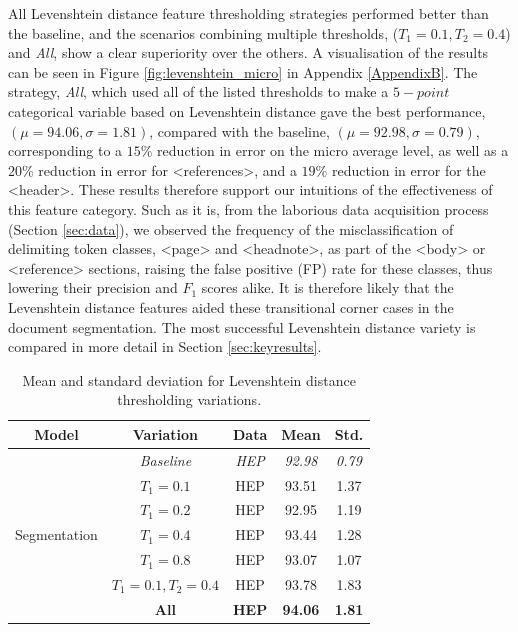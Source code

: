 All Levenshtein distance feature thresholding strategies performed better than the baseline, and the scenarios combining multiple thresholds, ($T_1 = 0.1, T_2 = 0.4$) and \emph{All}, show a clear superiority over the others. A visualisation of the results can be seen in Figure \ref{fig:levenshtein_micro} in Appendix \ref{AppendixB}. The strategy, \emph{All}, which used all of the listed thresholds to make a $5-point$ categorical variable based on Levenshtein distance gave the best performance, $(\mu = 94.06, \sigma = 1.81)$, compared with the baseline, $(\mu = 92.98, \sigma = 0.79)$, corresponding to a $15\%$ reduction in error on the micro average level, as well as a $20\%$ reduction in error for <references>, and a $19\%$ reduction in error for the <header>. These results therefore support our intuitions of the effectiveness of this feature category. Such as it is, from the laborious data acquisition process (Section \ref{sec:data}), we observed the frequency of the misclassification of delimiting token classes, <page> and <headnote>, as part of the <body> or <reference> sections, raising the false positive (FP) rate for these classes, thus lowering their precision and $F_1$ scores alike. It is therefore likely that the Levenshtein distance features aided these transitional corner cases in the document segmentation. The most successful Levenshtein distance variety is compared in more detail in Section \ref{sec:keyresults}. 

\begin{table}[h]
\begin{center}
\begin{tabular}{|c|c|c|c|c|}
\hline
Model & Variation & Data & Mean & Std.\\
\hline
\multirow{7}{*}{Segmentation} & \emph{Baseline} & \emph{HEP} & \emph{92.98} & \emph{0.79} \\\cline{2-5}
& $T_1 = 0.1$ & HEP & 93.51 & 1.37\\\cline{2-5}
& $T_1 = 0.2$ & HEP & 92.95 & 1.19\\\cline{2-5}
& $T_1 = 0.4$ & HEP & 93.44 & 1.28\\\cline{2-5}
& $T_1 = 0.8$ & HEP & 93.07 & 1.07\\\cline{2-5}
& $T_1 = 0.1, T_2 = 0.4$ & HEP & 93.78 & 1.83\\\cline{2-5}
& \textbf{All} & \textbf{HEP} & \textbf{94.06} & \textbf{1.81}\\\cline{2-5}
\hline
\end{tabular}
\caption{Mean and standard deviation for Levenshtein distance thresholding variations.}
\label{table:levenshteinresults}
\end{center}
\end{table}

